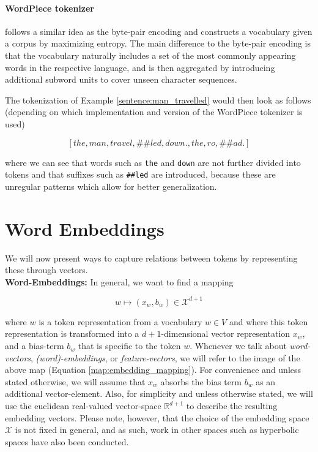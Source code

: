 \documentclass[a4paper,12pt,oneside,openright]{report}
\begin{document}
\paragraph{WordPiece tokenizer} \label{tokenizer:WordPiece} \cite{wu16} follows a similar idea as the byte-pair encoding and constructs a vocabulary given a corpus by maximizing entropy.
The main difference to the byte-pair encoding is that the vocabulary naturally includes a set of the most commonly appearing words in the respective language, and is then aggregated by introducing additional subword units to cover unseen character sequences.

The tokenization of Example \ref{sentence:man_travelled} would then look as follows (depending on which implementation and version of the WordPiece tokenizer is used)

$$
[the, man, travel, \#\#led, down., the, ro,  \#\#ad.]
$$

where we can see that words such as \Verb#the# and \Verb#down# are not further divided into tokens and that suffixes such as \Verb!##led! are introduced, because these are unregular patterns which allow for better generalization.


\section{Word Embeddings}

We will now present ways to capture relations between tokens by representing these through vectors. \\

\textbf{Word-Embeddings:} In general, we want to find a mapping 

\begin{equation}
\label{map:embedding_mapping}
w \mapsto (x_w, b_w) \in \mathcal{X}^{d + 1}
\end{equation}

where $w$ is a token representation from a vocabulary $w \in V$ and where this token representation is transformed into a $d+1$-dimensional vector representation $x_w$, and a bias-term $b_w$ that is specific to the token $w$.
Whenever we talk about \textit{word-vectors}, \textit{(word)-embeddings}, or \textit{feature-vectors}, we will refer to the image of the above map (Equation \ref{map:embedding_mapping}). 
For convenience and unless stated otherwise, we will assume that $x_w$ absorbs the bias term $b_w$ as an additional vector-element.
Also, for simplicity and unless otherwise stated, we will use the euclidean real-valued vector-space $\mathbb{R}^{d+1}$ to describe the resulting embedding vectors.
Please note, however, that the choice of the embedding space $\mathcal{X}$ is not fixed in general, and as such, work in other spaces such as hyperbolic spaces  \cite{ganea18} have also been conducted. \\
\end{document}
